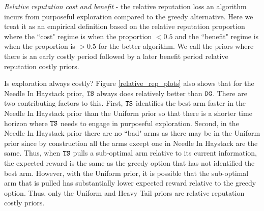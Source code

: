 \documentclass[../competing_bandits.tex]{subfiles}
\begin{document}
{\begin{definition}
\textit{Relative reputation cost and benefit} - the relative reputation loss an algorithm incurs from purposeful exploration compared to the greedy alternative. Here we treat it as an empirical definition based on the relative reputation proportion where the ``cost" regime is when the proportion $< 0.5$ and the ``benefit" regime is when the proportion is $> 0.5$ for the better algorithm. We call the priors where there is an early costly period followed by a later benefit period relative reputation costly priors.
\end{definition}
Is exploration always costly? Figure \ref{relative_rep_plots} also shows that for the Needle In Haystack prior, $\mathtt{TS}$ always does relatively better than $\mathtt{DG}$. There are two contributing factors to this. First, $\mathtt{TS}$ identifies the best arm faster in the Needle In Haystack prior than the Uniform prior so that there is a shorter time horizon where $\mathtt{TS}$ needs to engage in purposeful exploration. Second, in the Needle In Haystack prior there are no ``bad" arms as there may be in the Uniform prior since by construction all the arms except one in Needle In Haystack are the same. Thus, when $\mathtt{TS}$ pulls a sub-optimal arm relative to its current information, the expected reward is the same as the greedy option that has not identified the best arm. However, with the Uniform prior, it is possible that the sub-optimal arm that is pulled has substantially lower expected reward relative to the greedy option. Thus, only the Uniform and Heavy Tail priors are relative reputation costly priors.

}
\end{document}
